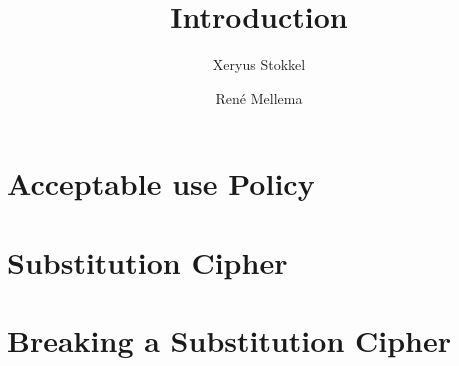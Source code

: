 \documentclass[a4paper, 10pt]{article}
\title{Introduction}
\author{Xeryus Stokkel \and Ren\'e Mellema}
\date{} %
\begin{document}
\maketitle

\section{Acceptable use Policy}


\section{Substitution Cipher}


\section{Breaking a Substitution Cipher}

\end{document}
